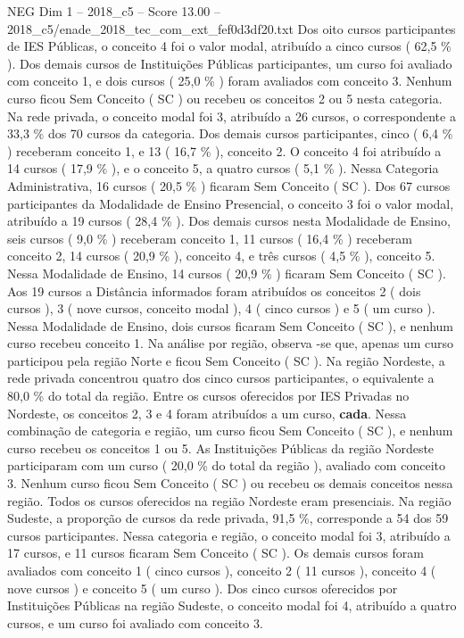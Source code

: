\begin{textsample}{NEG Dim 1 – 2018\_c5 – Score 13.00 – 2018\_c5/enade\_2018\_tec\_com\_ext\_fef0d3df20.txt}
Dos oito cursos participantes de IES Públicas, o conceito 4 foi o valor modal, atribuído a cinco cursos ( 62,5 \% ).
Dos demais cursos de Instituições Públicas participantes, um curso foi avaliado com conceito 1, e dois cursos ( 25,0 \% ) foram avaliados com conceito 3.
Nenhum curso ficou Sem Conceito ( SC ) ou recebeu os conceitos 2 ou 5 nesta categoria.
Na rede privada, o conceito modal foi 3, atribuído a 26 cursos, o correspondente a 33,3 \% dos 70 cursos da categoria.
Dos demais cursos participantes, cinco ( 6,4 \% ) receberam conceito 1, e 13 ( 16,7 \% ), conceito 2.
O conceito 4 foi atribuído a 14 cursos ( 17,9 \% ), e o conceito 5, a quatro cursos ( 5,1 \% ).
Nessa Categoria Administrativa, 16 cursos ( 20,5 \% ) ficaram Sem Conceito ( SC ).
Dos 67 cursos participantes da Modalidade de Ensino Presencial, o conceito 3 foi o valor modal, atribuído a 19 cursos ( 28,4 \% ).
Dos demais cursos nesta Modalidade de Ensino, seis cursos ( 9,0 \% ) receberam conceito 1, 11 cursos ( 16,4 \% ) receberam conceito 2, 14 cursos ( 20,9 \% ), conceito 4, e três cursos ( 4,5 \% ), conceito 5.
Nessa Modalidade de Ensino, 14 cursos ( 20,9 \% ) ficaram Sem Conceito ( SC ).
Aos 19 cursos a Distância informados foram atribuídos os conceitos 2 ( dois cursos ), 3 ( nove cursos, conceito modal ), 4 ( cinco cursos ) e 5 ( um curso ).
Nessa Modalidade de Ensino, dois cursos ficaram Sem Conceito ( SC ), e nenhum curso recebeu conceito 1.
Na análise por região, observa -se que, apenas um curso participou pela região Norte e ficou Sem Conceito ( SC ).
Na região Nordeste, a rede privada concentrou quatro dos cinco cursos participantes, o equivalente a 80,0 \% do total da região.
Entre os cursos oferecidos por IES Privadas no Nordeste, os conceitos 2, 3 e 4 foram atribuídos a um curso, \textbf{cada}.
Nessa combinação de categoria e região, um curso ficou Sem Conceito ( SC ), e nenhum curso recebeu os conceitos 1 ou 5.
As Instituições Públicas da região Nordeste participaram com um curso ( 20,0 \% do total da região ), avaliado com conceito 3.
Nenhum curso ficou Sem Conceito ( SC ) ou recebeu os demais conceitos nessa região.
Todos os cursos oferecidos na região Nordeste eram presenciais.
Na região Sudeste, a proporção de cursos da rede privada, 91,5 \%, corresponde a 54 dos 59 cursos participantes.
Nessa categoria e região, o conceito modal foi 3, atribuído a 17 cursos, e 11 cursos ficaram Sem Conceito ( SC ).
Os demais cursos foram avaliados com conceito 1 ( cinco cursos ), conceito 2 ( 11 cursos ), conceito 4 ( nove cursos ) e conceito 5 ( um curso ).
Dos cinco cursos oferecidos por Instituições Públicas na região Sudeste, o conceito modal foi 4, atribuído a quatro cursos, e um curso foi avaliado com conceito 3.

\end{textsample}
